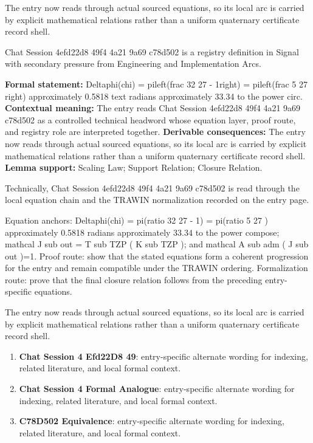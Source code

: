 The entry now reads through actual sourced equations, so its local arc is carried by explicit mathematical relations rather than a uniform quaternary certificate record shell.
\clearpage


\begingroup\small
{}
Chat Session 4efd22d8 49f4 4a21 9a69 c78d502 is a registry definition in Signal with secondary pressure from Engineering and Implementation Arcs.

\begingroup\footnotesize\setlength{\emergencystretch}{3em}\sloppy
\textbf{Formal statement:} Deltaphi(chi) = pileft(frac 32 27 - 1right) = pileft(frac 5 27 right) approximately 0.5818 text radians approximately 33.34 to the power circ. \textbf{Contextual meaning:} The entry reads Chat Session 4efd22d8 49f4 4a21 9a69 c78d502 as a controlled technical headword whose equation layer, proof route, and registry role are interpreted together. \textbf{Derivable consequences:} The entry now reads through actual sourced equations, so its local arc is carried by explicit mathematical relations rather than a uniform quaternary certificate record shell. \textbf{Lemma support:} Scaling Law; Support Relation; Closure Relation.\par
\endgroup

Technically, Chat Session 4efd22d8 49f4 4a21 9a69 c78d502 is read through the local equation chain and the TRAWIN normalization recorded on the entry page.

Equation anchors: Deltaphi(chi) = pi(ratio 32 27 - 1) = pi(ratio 5 27 ) approximately 0.5818 radians approximately 33.34 to the power compose; mathcal J sub out = T sub TZP ( K sub TZP ); and mathcal A sub adm ( J sub out )=1. Proof route: show that the stated equations form a coherent progression for the entry and remain compatible under the TRAWIN ordering. Formalization route: prove that the final closure relation follows from the preceding entry-specific equations.

The entry now reads through actual sourced equations, so its local arc is carried by explicit mathematical relations rather than a uniform quaternary certificate record shell.
\endgroup

\begin{enumerate}[leftmargin=1.6em,itemsep=6pt,topsep=4pt]
\item \textbf{Chat Session 4 Efd22D8 49}: entry-specific alternate wording for indexing, related literature, and local formal context.
\item \textbf{Chat Session 4 Formal Analogue}: entry-specific alternate wording for indexing, related literature, and local formal context.
\item \textbf{C78D502 Equivalence}: entry-specific alternate wording for indexing, related literature, and local formal context.
\end{enumerate}

